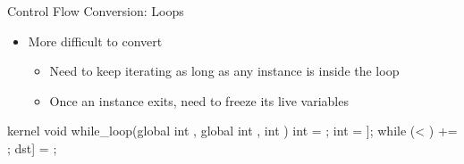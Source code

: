 \begin{frame}[fragile]{Control Flow Conversion: Loops}

\begin{minipage}[t]{0.45\linewidth}

\begin{itemize}
    \item More difficult to convert
    \begin{itemize}
        \item Need to keep iterating as long as any instance is inside the loop
        \item Once an instance exits, need to freeze its live variables
    \end{itemize}
\end{itemize}

\begin{codebox}[commandchars=\\\[\]]
kernel void while_loop(global int \uniform[*src],
                       global int \uniform[*dst],
                       int \uniform[step]) {
  int \varying[tid] = ;
  int \varying[val] = \uniform[src]\idx[\varying[tid]];
  while (\varying[val] < \uniform[0]) {
    \varying[val] += \uniform[step];
  }
  dst\idx[\varying[tid]] = \varying[val];
}
\end{codebox}

\end{minipage}
\hspace{1em}
\begin{minipage}[t]{0.43\linewidth}

\vspace{0.1ex}


\end{minipage}

\end{frame}

